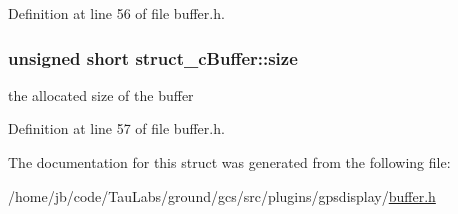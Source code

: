 \-Definition at line 56 of file buffer.\-h.

\hypertarget{structstruct__c_buffer_a80e300447a52eb0b66fd4d754aeb9b1c}{
\subsubsection[{size}]{\setlength{\rightskip}{0pt plus 5cm}unsigned short {\bf struct\-\_\-c\-Buffer\-::size}}}\label{structstruct__c_buffer_a80e300447a52eb0b66fd4d754aeb9b1c}


the allocated size of the buffer 



\-Definition at line 57 of file buffer.\-h.



\-The documentation for this struct was generated from the following file\-:\begin{DoxyCompactItemize}
\item 
/home/jb/code/\-Tau\-Labs/ground/gcs/src/plugins/gpsdisplay/\hyperlink{buffer_8h}{buffer.\-h}\end{DoxyCompactItemize}
